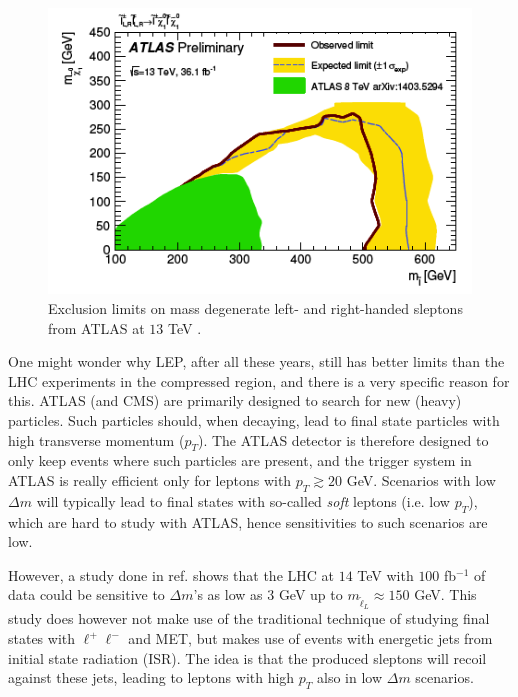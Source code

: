 \documentclass[twocolumn,a4paper,10pt]{article}
\begin{document}
\begin{figure}
\begin{center}
\includegraphics[scale=0.5]{Run2exclusion_new.png}
\caption{Exclusion limits on mass degenerate left- and right-handed sleptons from ATLAS at $13$ TeV 
\cite{ATLAS:2017}.}
\label{fig:ATLAS 13TeV}
\end{center}
\end{figure}

One might wonder why LEP, after all these years, still has better limits than the LHC experiments in the 
compressed region, and there is a very specific reason for this. ATLAS (and CMS) are primarily designed 
to search for new (heavy) particles. Such particles should, when decaying, lead to final state particles 
with high transverse momentum ($p_T$). The ATLAS detector is therefore designed to only keep events where 
such particles are present, and the trigger system \cite{ATLAS triggers} in ATLAS is really efficient 
only for leptons with $p_T \gtrsim 20$ GeV. Scenarios with low $\Delta m$ will typically lead to final 
states with so-called \textit{soft} leptons (i.e. low $p_T$), which are hard to study with ATLAS, hence 
sensitivities to such scenarios are low. 

However, a study done in ref. \cite{Compressed sleptons} shows that the LHC at $14$ TeV with $100$ 
fb$^{-1}$ of data could be sensitive to $\Delta m$'s as low as $3$ GeV up to 
$m_{\tilde{\ell}_L} \approx 150$ GeV. This study does however not make use of the traditional 
technique of studying final states with $\ell^+ \ell^-$ and MET, but makes use of events with 
energetic jets from initial state radiation (ISR). The idea is that the produced sleptons will recoil 
against these jets, leading to leptons with high $p_T$ also in low $\Delta m$ scenarios.        
\end{document}
